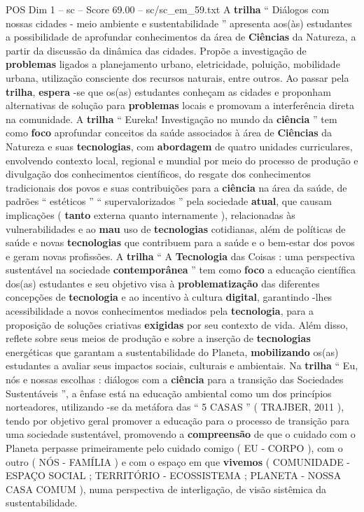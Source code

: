 \begin{textsample}{POS Dim 1 – sc – Score 69.00 – sc/sc\_em\_59.txt}
A \textbf{trilha} “ Diálogos com nossas cidades - meio ambiente e sustentabilidade ” apresenta aos(às) estudantes a possibilidade de aprofundar conhecimentos da área de \textbf{Ciências} da Natureza, a partir da discussão da dinâmica das cidades.
Propõe a investigação de \textbf{problemas} ligados a planejamento urbano, eletricidade, poluição, mobilidade urbana, utilização consciente dos recursos naturais, entre outros.
Ao passar pela \textbf{trilha}, \textbf{espera} -se que os(as) estudantes conheçam as cidades e proponham alternativas de solução para \textbf{problemas} locais e promovam a interferência direta na comunidade.
A \textbf{trilha} “ Eureka!
Investigação no mundo da \textbf{ciência} ” tem como \textbf{foco} aprofundar conceitos da saúde associados à área de \textbf{Ciências} da Natureza e suas \textbf{tecnologias}, com \textbf{abordagem} de quatro unidades curriculares, envolvendo contexto local, regional e mundial por meio do processo de produção e divulgação dos conhecimentos científicos, do resgate dos conhecimentos tradicionais dos povos e suas contribuições para a \textbf{ciência} na área da saúde, de padrões “ estéticos ” “ supervalorizados ” pela sociedade \textbf{atual}, que causam implicações ( \textbf{tanto} externa quanto internamente ), relacionadas às vulnerabilidades e ao \textbf{mau} uso de \textbf{tecnologias} cotidianas, além de políticas de saúde e novas \textbf{tecnologias} que contribuem para a saúde e o bem-estar dos povos e geram novas profissões.
A \textbf{trilha} “ A \textbf{Tecnologia} das Coisas : uma perspectiva sustentável na sociedade \textbf{contemporânea} ” tem como \textbf{foco} a educação científica dos(as) estudantes e seu objetivo visa à \textbf{problematização} das diferentes concepções de \textbf{tecnologia} e ao incentivo à cultura \textbf{digital}, garantindo -lhes acessibilidade a novos conhecimentos mediados pela \textbf{tecnologia}, para a proposição de soluções criativas \textbf{exigidas} por seu contexto de vida.
Além disso, reflete sobre seus meios de produção e sobre a inserção de \textbf{tecnologias} energéticas que garantam a sustentabilidade do Planeta, \textbf{mobilizando} os(as) estudantes a avaliar seus impactos sociais, culturais e ambientais.
Na \textbf{trilha} “ Eu, nós e nossas escolhas : diálogos com a \textbf{ciência} para a transição das Sociedades Sustentáveis ”, a ênfase está na educação ambiental como um dos princípios norteadores, utilizando -se da metáfora das “ 5 CASAS ” ( TRAJBER, 2011 ), tendo por objetivo geral promover a educação para o processo de transição para uma sociedade sustentável, promovendo a \textbf{compreensão} de que o cuidado com o Planeta perpasse primeiramente pelo cuidado comigo ( EU - CORPO ), com o outro ( NÓS - FAMÍLIA ) e com o espaço em que \textbf{vivemos} ( COMUNIDADE - ESPAÇO SOCIAL ; TERRITÓRIO - ECOSSISTEMA ; PLANETA - NOSSA CASA COMUM ), numa perspectiva de interligação, de visão sistêmica da sustentabilidade.

\end{textsample}
